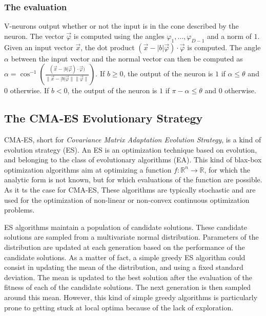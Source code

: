 \subsubsection{The evaluation}

V-neurons output whether or not the input is in the cone described by the neuron. The vector $\overrightarrow{\varphi}$ is computed using the angles $\varphi_1, \ldots, \varphi_{D-1}$
and a norm of $1$. Given an input vector $\overrightarrow{x}$, the dot product $(\overrightarrow{x} - \lvert b \rvert \overrightarrow{\varphi}) \cdot \overrightarrow{\varphi}$ is computed.
The angle $\alpha$ between the input vector and the normal vector can then be computed as
$\alpha = \cos^{-1}(\frac{(\overrightarrow{x} - \lvert b \rvert \overrightarrow{\varphi}) \cdot \overrightarrow{\varphi})}{\lVert \overrightarrow{x} - \lvert b \rvert \overrightarrow{\varphi} \rVert
\lVert \overrightarrow{\varphi} \rVert})$. If $b \geq 0$, the output of the neuron is $1$ if $\alpha \leq \theta$ and $0$ otherwise. If $b < 0$, the output of the neuron is
$1$ if $\pi - \alpha \leq \theta$ and $0$ otherwise.

\subsection{The CMA-ES Evolutionary Strategy}

CMA-ES, short for \textit{Covariance Matrix Adaptation Evolution Strategy}, is a kind of evolution strategy (ES). An ES is an optimization technique based on evolution, and
belonging to the class of evolutionary algorithms (EA).
This kind of blax-box optimization algorithms aim at optimizing a function $f : \mathds{R}^n \to \mathds{R}$, for which the analytic form is not known,
but for which evaluations of the function are possible. As it ts the case for CMA-ES, These algorithms are typically stochastic and are used for the optimization of
non-linear or non-convex continuous optimization problems.

ES algorithms maintain a population of candidate solutions. These candidate solutions are sampled from a multivariate normal distribution. Parameters of the distribution
are updated at each generation based on the performance of the candidate solutions. As a matter of fact, a simple greedy ES algorithm could consist in updating the
mean of the distribution, and using a fixed standard deviation. The mean is updated to the best solution after the evaluation of the fitness of each of the candidate
solutions. The next generation is then sampled around this mean. However, this kind of simple greedy algorithms is particularly prone to getting stuck at local optima because
of the lack of exploration.

